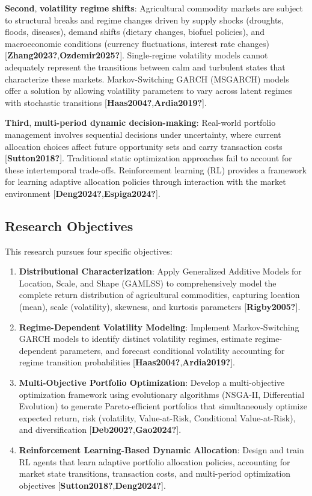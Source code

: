 \documentclass[
  10pt,
  a4paper,
]{article}
\begin{document}
\textbf{Second}, \textbf{volatility regime shifts}: Agricultural
commodity markets are subject to structural breaks and regime changes
driven by supply shocks (droughts, floods, diseases), demand shifts
(dietary changes, biofuel policies), and macroeconomic conditions
(currency fluctuations, interest rate changes)
{[}\textbf{Zhang2023?},\textbf{Ozdemir2025?}{]}. Single-regime
volatility models cannot adequately represent the transitions between
calm and turbulent states that characterize these markets.
Markov-Switching GARCH (MSGARCH) models offer a solution by allowing
volatility parameters to vary across latent regimes with stochastic
transitions {[}\textbf{Haas2004?},\textbf{Ardia2019?}{]}.

\textbf{Third}, \textbf{multi-period dynamic decision-making}:
Real-world portfolio management involves sequential decisions under
uncertainty, where current allocation choices affect future opportunity
sets and carry transaction costs {[}\textbf{Sutton2018?}{]}. Traditional
static optimization approaches fail to account for these intertemporal
trade-offs. Reinforcement learning (RL) provides a framework for
learning adaptive allocation policies through interaction with the
market environment {[}\textbf{Deng2024?},\textbf{Espiga2024?}{]}.

\subsection{Research Objectives}\label{sec-objectives}

This research pursues four specific objectives:

\begin{enumerate}
\def\labelenumi{\arabic{enumi}.}
\item
  \textbf{Distributional Characterization}: Apply Generalized Additive
  Models for Location, Scale, and Shape (GAMLSS) to comprehensively
  model the complete return distribution of agricultural commodities,
  capturing location (mean), scale (volatility), skewness, and kurtosis
  parameters {[}\textbf{Rigby2005?}{]}.
\item
  \textbf{Regime-Dependent Volatility Modeling}: Implement
  Markov-Switching GARCH models to identify distinct volatility regimes,
  estimate regime-dependent parameters, and forecast conditional
  volatility accounting for regime transition probabilities
  {[}\textbf{Haas2004?},\textbf{Ardia2019?}{]}.
\item
  \textbf{Multi-Objective Portfolio Optimization}: Develop a
  multi-objective optimization framework using evolutionary algorithms
  (NSGA-II, Differential Evolution) to generate Pareto-efficient
  portfolios that simultaneously optimize expected return, risk
  (volatility, Value-at-Risk, Conditional Value-at-Risk), and
  diversification {[}\textbf{Deb2002?},\textbf{Gao2024?}{]}.
\item
  \textbf{Reinforcement Learning-Based Dynamic Allocation}: Design and
  train RL agents that learn adaptive portfolio allocation policies,
  accounting for market state transitions, transaction costs, and
  multi-period optimization objectives
  {[}\textbf{Sutton2018?},\textbf{Deng2024?}{]}.
\end{enumerate}
\end{document}
